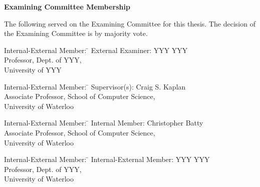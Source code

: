 \pagestyle{plain}
\setcounter{page}{2}

\cleardoublepage %

 
\begin{center}\textbf{Examining Committee Membership}\end{center}
  \noindent
The following served on the Examining Committee for this thesis. The decision of the Examining Committee is by majority vote.
  \bigskip
  
  \noindent
\begin{tabbing}
Internal-External Member: \=  \kill %
External Examiner: \>  YYY YYY \\ 
\> Professor, Dept. of YYY, \\
\> University of YYY \\
\end{tabbing} 
  \bigskip
  
  \noindent
\begin{tabbing}
Internal-External Member: \=  \kill %
Supervisor(s): \> Craig S. Kaplan \\
\> Associate Professor, School of Computer Science, \\ 
\> University of Waterloo \\
\end{tabbing}
  \bigskip
  
  \noindent
  \begin{tabbing}
Internal-External Member: \=  \kill %
Internal Member: \> Christopher Batty \\
\> Associate Professor, School of Computer Science, \\ 
\> University of Waterloo \\
\end{tabbing}
  \bigskip
  
  \noindent
\begin{tabbing}
Internal-External Member: \=  \kill %
Internal-External Member: \> YYY YYY \\
\> Professor, Dept. of YYY, \\
\> University of Waterloo \\
\end{tabbing}
  \bigskip
  
